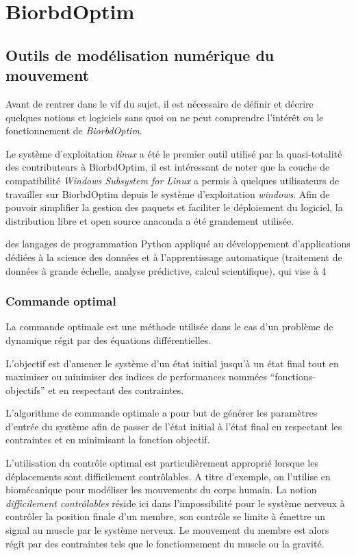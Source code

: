 \part{BiorbdOptim}
    \chapter[Outils de modélisation]{Outils de modélisation numérique du mouvement}
    
    
Avant de rentrer dans le vif du sujet, il est nécessaire de définir et décrire quelques notions et logiciels sans quoi on ne peut comprendre l'intérêt ou le fonctionnement de \emph{BiorbdOptim}.

Le système d'exploitation \emph{\gls{linux}} a été le premier outil utilisé par la quasi-totalité des contributeurs à BiorbdOptim, il est intéressant de noter que la couche de compatibilité \emph{Windows Subsystem for Linux} a permis à quelques utilisateurs de travailler sur BiorbdOptim depuis le système d'exploitation \emph{windows}. Afin de pouvoir simplifier la gestion des paquets et faciliter le déploiement du logiciel, la distribution libre et open source \gls{anaconda} a été grandement utilisée.

des langages de programmation Python appliqué au développement d'applications dédiées à la science des données et à l'apprentissage automatique (traitement de données à grande échelle, analyse prédictive, calcul scientifique), qui vise à 4

        \section{Commande optimal}
        
\label{commande_optimale}
La commande optimale est une méthode utilisée dans le cas d’un problème de dynamique
régit par des équations différentielles.

L’objectif est d’amener le système d’un état initial jusqu’à un état final tout en maximiser ou minimiser des indices de performances nommées ``fonctions-objectifs'' et en respectant des contraintes.

L’algorithme de commande optimale a pour but de générer les paramètres d’entrée
du système afin de passer de l’état initial à l’état final en respectant les contraintes
et en minimisant la fonction objectif.

L'utilisation du contrôle optimal est particulièrement approprié lorsque les déplacements sont difficilement contrôlables. A titre d'exemple, on l'utilise en biomécanique pour modéliser les mouvements du corps humain. La notion \emph{difficilement contrôlables} réside ici dans l'impossibilité pour le système nerveux à contrôler la position finale d'un membre, son contrôle se limite à émettre un signal au muscle par le système nerveux. Le mouvement du membre est alors régit par des contraintes tels que le fonctionnement du muscle ou la gravité. 

